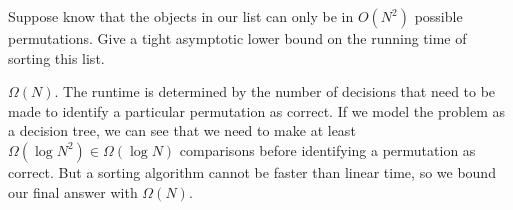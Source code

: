 \question Suppose know that the objects in our list can only be in $O(N^2)$
possible permutations. Give a tight asymptotic lower bound on the running time
of sorting this list.

\begin{solution}[1in]
$\Omega(N)$. The runtime is determined by the number of decisions that need to
be made to identify a particular permutation as correct. If we model the
problem as a decision tree, we can see that we need to make at least
$\Omega(\log{N^2}) \in \Omega(\log N)$ comparisons before identifying a
permutation as correct. But a sorting algorithm cannot be faster than linear
time, so we bound our final answer with $\Omega(N)$.
\end{solution}
